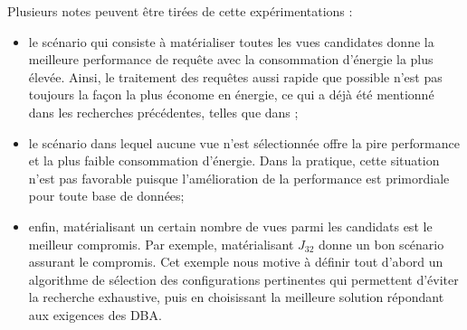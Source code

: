 \begin{example}
Plusieurs notes peuvent être tirées de cette expérimentations :
\begin{itemize}
\item le scénario qui consiste à matérialiser toutes les vues candidates donne la meilleure performance de requête avec la consommation d'énergie la plus élevée. Ainsi, le traitement des requêtes aussi rapide que possible n'est pas toujours la façon la plus économe en énergie, ce qui a déjà été mentionné dans les recherches précédentes, telles que dans \cite{Lang11, Xu10b, Kunjir12};
\item le scénario dans lequel aucune vue n'est sélectionnée offre la pire performance et la plus faible consommation d'énergie. Dans la pratique, cette situation n'est pas favorable puisque l'amélioration de la performance est primordiale pour toute base de données;
\item enfin, matérialisant un certain nombre de vues parmi les candidats est le meilleur compromis. Par exemple, matérialisant $J_{32}$ donne un bon scénario assurant le compromis. Cet exemple nous motive à définir tout d'abord un algorithme de sélection des configurations pertinentes qui permettent d'éviter la recherche exhaustive, puis en choisissant la meilleure solution répondant aux exigences des DBA.
\end{itemize}
\end{example}


